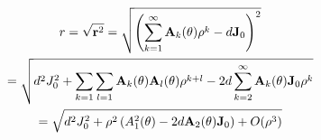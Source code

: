 \documentclass{article}
\begin{document}
\begin{multline}
	r = \sqrt{{\bf r}^2}
	=
	\sqrt{
		\left(
			\sum_{k=1}^{\infty} {\bf A}_k(\theta) \rho^k - d {\bf J}_0
		\right)^2
	}
	\\
	=
	\sqrt{
		d^2 J_0^2 + \sum_{k=1}\sum_{l=1} {\bf A}_k(\theta) {\bf A}_l(\theta) \rho^{k+l}
		-2d\sum_{k=2}^{\infty} {\bf A}_k(\theta) {\bf J}_0 \rho^k
	}
	\\
	=
	\sqrt{
		d^2 J_0^2 + \rho^2 \left(A_1^2(\theta) - 2d {\bf A}_2(\theta) {\bf J}_0\right) + O(\rho^3)
	}
\end{multline}
\end{document}
